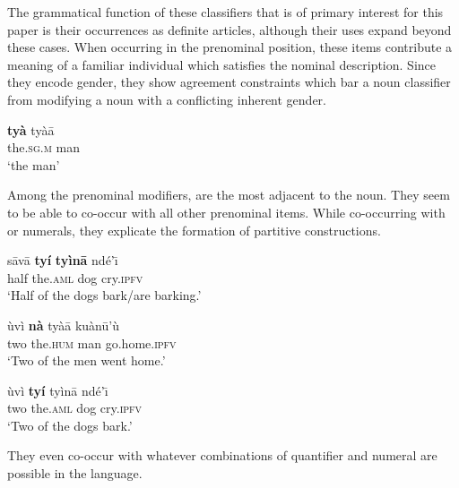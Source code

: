 \documentclass[output=paper,modfonts,nonflat]{langsci/langscibook}
\begin{document}
The grammatical function of these classifiers that is of primary interest for this paper is their occurrences as definite articles, although their uses expand beyond these cases.  When occurring in the prenominal position, these items contribute a meaning of a familiar individual which satisfies the nominal description.  Since they encode gender, they show agreement constraints which bar a noun classifier from modifying a noun with a conflicting inherent gender.

\ea {}\label{ex:cisneros:44}
\gll
\textbf{ty\`a} ty\`a\=a\\
the.\textsc{sg.m} man\\
\glt
`the man'
\z 

\z 

Among the prenominal modifiers,  are the most adjacent to the noun.  They seem to be able to co-occur with all other prenominal items.  While co-occurring with  or numerals, they explicate the formation of partitive constructions.

\ea {}\label{ex:cisneros:46}
\gll
{\ob}s\=av\=a \textbf{ty\'i} \textbf{ty\`in\=a}{\cb} nd\'e'\=\i\\
{\db}half the.\textsc{aml} dog cry.\textsc{ipfv}\\
\glt
`Half of the dogs bark/are barking.'
\z 

\ea {}\label{ex:cisneros:47}
\gll
{\ob}\`uv\`i \textbf{n\`a} ty\`a\=a{\cb} ku\`an\=u'\`u\\
{\db}two the.\textsc{hum} man go.home.\textsc{ipfv}\\
\glt
`Two of the men went home.'
\z 

\ea {}\label{ex:cisneros:48}
\gll
{\ob}\`uv\`i \textbf{ty\'i} ty\`in\=a{\cb} nd\'e'\=\i\\
{\db}two the.\textsc{aml} dog cry.\textsc{ipfv}\\
\glt
`Two of the dogs bark.'
\z 

They even co-occur with whatever combinations of quantifier and numeral are possible in the language.

\z 
\end{document}
